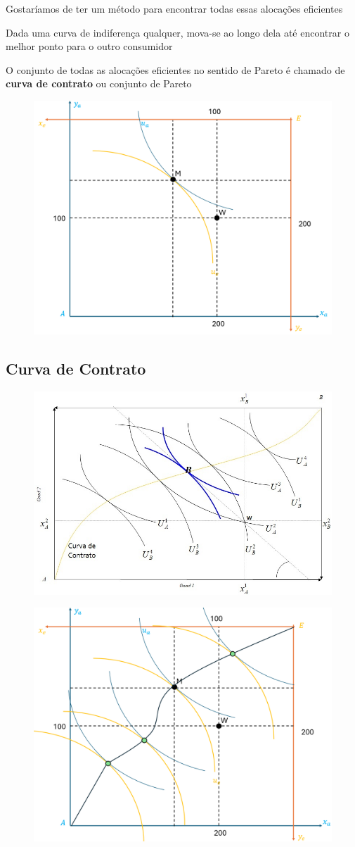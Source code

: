 \documentclass[a4paper,12pt]{article}[abntex2]
\begin{document}
Gostaríamos de ter um método para encontrar todas essas alocações eficientes

Dada uma curva de indiferença qualquer, mova-se ao longo dela até encontrar o melhor ponto para o outro consumidor

O conjunto de todas as alocações eficientes no sentido de Pareto é chamado de \textbf{curva de contrato} ou conjunto de Pareto

\begin{figure}[H]
    \centering
    \includegraphics[width=0.70\linewidth]{Imagens/a2i12.png}
\end{figure}

\subsection{\textbf{Curva de Contrato}}

\begin{figure}[H]
    \centering
    \includegraphics[width=0.70\linewidth]{Imagens/a2i5.png}
\end{figure}

\begin{figure}[H]
    \centering
    \includegraphics[width=0.70\linewidth]{Imagens/a2i13.png}
\end{figure}
\end{document}
